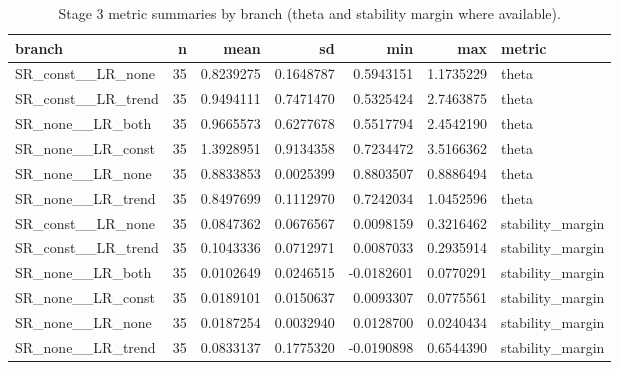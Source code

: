 \begin{table}[!h]
\centering
\caption{Stage 3 metric summaries by branch (theta and stability margin where available).}
\centering
\begin{tabular}[t]{lrrrrrl}
\toprule
branch & n & mean & sd & min & max & metric\\
\midrule
SR\_const\_\_LR\_none & 35 & 0.8239275 & 0.1648787 & 0.5943151 & 1.1735229 & theta\\
SR\_const\_\_LR\_trend & 35 & 0.9494111 & 0.7471470 & 0.5325424 & 2.7463875 & theta\\
SR\_none\_\_LR\_both & 35 & 0.9665573 & 0.6277678 & 0.5517794 & 2.4542190 & theta\\
SR\_none\_\_LR\_const & 35 & 1.3928951 & 0.9134358 & 0.7234472 & 3.5166362 & theta\\
SR\_none\_\_LR\_none & 35 & 0.8833853 & 0.0025399 & 0.8803507 & 0.8886494 & theta\\
\addlinespace
SR\_none\_\_LR\_trend & 35 & 0.8497699 & 0.1112970 & 0.7242034 & 1.0452596 & theta\\
SR\_const\_\_LR\_none & 35 & 0.0847362 & 0.0676567 & 0.0098159 & 0.3216462 & stability\_margin\\
SR\_const\_\_LR\_trend & 35 & 0.1043336 & 0.0712971 & 0.0087033 & 0.2935914 & stability\_margin\\
SR\_none\_\_LR\_both & 35 & 0.0102649 & 0.0246515 & -0.0182601 & 0.0770291 & stability\_margin\\
SR\_none\_\_LR\_const & 35 & 0.0189101 & 0.0150637 & 0.0093307 & 0.0775561 & stability\_margin\\
\addlinespace
SR\_none\_\_LR\_none & 35 & 0.0187254 & 0.0032940 & 0.0128700 & 0.0240434 & stability\_margin\\
SR\_none\_\_LR\_trend & 35 & 0.0833137 & 0.1775320 & -0.0190898 & 0.6544390 & stability\_margin\\
\bottomrule
\end{tabular}
\end{table}
